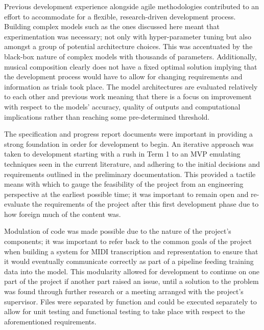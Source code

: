 \documentclass[12pt,]{article}
\begin{document}
Previous development experience alongside agile methodologies
contributed to an effort to accommodate for a flexible, research-driven
development process. Building complex models such as the ones discussed
here meant that experimentation was necessary; not only with
hyper-parameter tuning but also amongst a group of potential
architecture choices. This was accentuated by the black-box nature of
complex models with thousands of parameters. Additionally, musical
composition clearly does not have a fixed optimal solution implying that
the development process would have to allow for changing requirements
and information as trials took place. The model architectures are
evaluated relatively to each other and previous work meaning that there
is a focus on improvement with respect to the models' accuracy, quality
of outputs and computational implications rather than reaching some
pre-determined threshold.

The specification and progress report documents were important in
providing a strong foundation in order for development to begin. An
iterative approach was taken to development starting with a rush in Term
1 to an MVP emulating techniques seen in the current literature, and
adhering to the initial decisions and requirements outlined in the
preliminary documentation. This provided a tactile means with which to
gauge the feasibility of the project from an engineering perspective at
the earliest possible time; it was important to remain open and
re-evaluate the requirements of the project after this first development
phase due to how foreign much of the content was.

Modulation of code was made possible due to the nature of the project's
components; it was important to refer back to the common goals of the
project when building a system for MIDI transcription and representation
to ensure that it would eventually communicate correctly as part of a
pipeline feeding training data into the model. This modularity allowed
for development to continue on one part of the project if another part
raised an issue, until a solution to the problem was found through
further research or a meeting arranged with the project's supervisor.
Files were separated by function and could be executed separately to
allow for unit testing and functional testing to take place with respect
to the aforementioned requirements.
\end{document}
